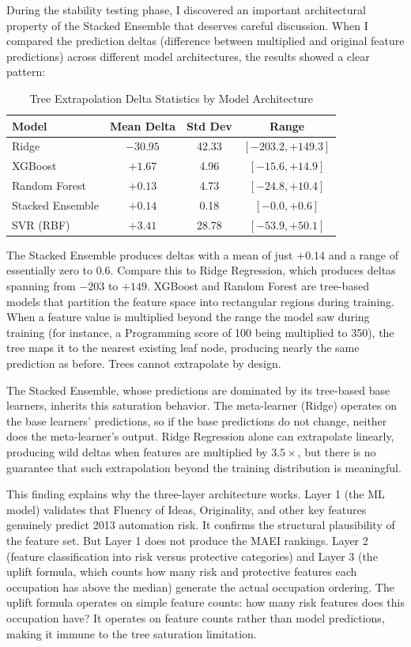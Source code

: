 During the stability testing phase, I discovered an important architectural property of the Stacked Ensemble that deserves careful discussion. When I compared the prediction deltas (difference between multiplied and original feature predictions) across different model architectures, the results showed a clear pattern:

\begin{table}[htbp]
\centering
\caption{Tree Extrapolation Delta Statistics by Model Architecture}
\label{tab:tree_delta}
\begin{tabular}{lccc}
\toprule
Model & Mean Delta & Std Dev & Range \\
\midrule
Ridge             & $-30.95$ & 42.33 & $[-203.2, +149.3]$ \\
XGBoost           & $+1.67$  & 4.96  & $[-15.6, +14.9]$   \\
Random Forest     & $+0.13$  & 4.73  & $[-24.8, +10.4]$   \\
Stacked Ensemble  & $+0.14$  & 0.18  & $[-0.0, +0.6]$     \\
SVR (RBF)         & $+3.41$  & 28.78 & $[-53.9, +50.1]$   \\
\bottomrule
\end{tabular}
\end{table}

The Stacked Ensemble produces deltas with a mean of just $+0.14$ and a range of essentially zero to 0.6. Compare this to Ridge Regression, which produces deltas spanning from $-203$ to $+149$. XGBoost and Random Forest are tree-based models that partition the feature space into rectangular regions during training. When a feature value is multiplied beyond the range the model saw during training (for instance, a Programming score of 100 being multiplied to 350), the tree maps it to the nearest existing leaf node, producing nearly the same prediction as before. Trees cannot extrapolate by design.

The Stacked Ensemble, whose predictions are dominated by its tree-based base learners, inherits this saturation behavior. The meta-learner (Ridge) operates on the base learners' predictions, so if the base predictions do not change, neither does the meta-learner's output. Ridge Regression alone can extrapolate linearly, producing wild deltas when features are multiplied by $3.5\times$, but there is no guarantee that such extrapolation beyond the training distribution is meaningful.

This finding explains why the three-layer architecture works. Layer 1 (the ML model) validates that Fluency of Ideas, Originality, and other key features genuinely predict 2013 automation risk. It confirms the structural plausibility of the feature set. But Layer 1 does not produce the MAEI rankings. Layer 2 (feature classification into risk versus protective categories) and Layer 3 (the uplift formula, which counts how many risk and protective features each occupation has above the median) generate the actual occupation ordering. The uplift formula operates on simple feature counts: how many risk features does this occupation have? It operates on feature counts rather than model predictions, making it immune to the tree saturation limitation.

